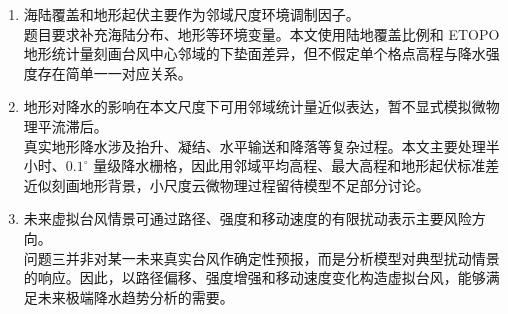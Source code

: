 \documentclass[UTF8,a4paper,zihao=5,fontset=fandol]{ctexart}
\numberwithin{equation}{section}
\numberwithin{figure}{section}
\numberwithin{table}{section}
\begin{document}
\begin{enumerate}[label={\textbf{假设\arabic*：}}]
  \item 海陆覆盖和地形起伏主要作为邻域尺度环境调制因子。\\
  题目要求补充海陆分布、地形等环境变量。本文使用陆地覆盖比例和 ETOPO 地形统计量刻画台风中心邻域的下垫面差异，但不假定单个格点高程与降水强度存在简单一一对应关系。
  \item 地形对降水的影响在本文尺度下可用邻域统计量近似表达，暂不显式模拟微物理平流滞后。\\
  真实地形降水涉及抬升、凝结、水平输送和降落等复杂过程。本文主要处理半小时、$0.1^\circ$ 量级降水栅格，因此用邻域平均高程、最大高程和地形起伏标准差近似刻画地形背景，小尺度云微物理过程留待模型不足部分讨论。
  \item 未来虚拟台风情景可通过路径、强度和移动速度的有限扰动表示主要风险方向。\\
  问题三并非对某一未来真实台风作确定性预报，而是分析模型对典型扰动情景的响应。因此，以路径偏移、强度增强和移动速度变化构造虚拟台风，能够满足未来极端降水趋势分析的需要。
\end{enumerate}
\end{document}
